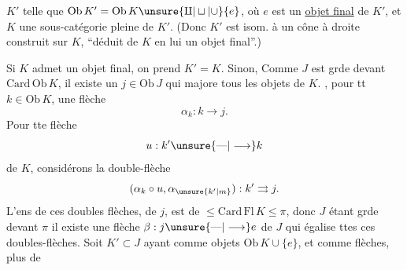  $K'$ telle que $\mathrm{Ob}\,K'=\mathrm{Ob}\,K\unsure{\amalg|\sqcup|\cup}\{e\}$, où $e$ est un \uline{objet final} de $K'$, et $K$    une sous-catégorie pleine de $K'$. (Donc  $K'$ est isom. à un cône à droite construit sur $K$, ``déduit de $K$ en lui  un objet final''.)

 Si $K$ admet un objet final, on prend $K'=K$. Sinon, Comme $J$ est grde devant $\mathrm{Card}\,\mathrm{Ob}\,K$, il existe un $j\in\mathrm{Ob}\,J$ qui majore tous les objets de $K$.  ,  pour tt $k\in\mathrm{Ob}\,K$, une flèche
\[
\alpha_k:k\longrightarrow j.
\]
Pour tte flèche
\[
u:k'\unsure{\text{---}|\longrightarrow}k
\]
de $K$, considérons la double-flèche
\[
(\alpha_k\circ u,\alpha_{\unsure{k'|m}}):k'\rightrightarrows j.
\]
L'ens de ces doubles flèches, de  $j$, est de  $\leq\mathrm{Card}\,\mathrm{Fl}\,K\leq\pi$, donc $J$ étant grde devant $\pi$ il existe une flèche $\beta:j\unsure{\text{---}|\longrightarrow}e$ de $J$ qui égalise ttes ces doubles-flèches. Soit $K'\subset J$ ayant comme objets $\mathrm{Ob}\,K\cup\{e\}$, et comme  flèches,   plus de
